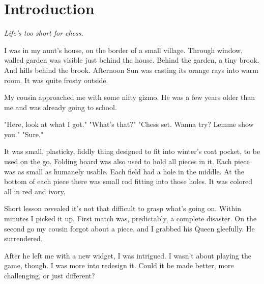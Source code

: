 

\chapter*{Introduction}
\label{ch:Introduction}

\begin{flushright}
\parbox{0.6\textwidth}{
\emph{Life's too short for chess.\newline
{} } }
\end{flushright}

\noindent
I was in my aunt's house, on the border of a small village.
Through window, walled garden was visible just behind the house.
Behind the garden, a tiny brook. And hills behind the brook.
Afternoon Sun was casting its orange rays into warm room. It
was quite frosty outside.

My cousin approached me with some nifty gizmo. He was a
few years older than me and was already going to school.

\noindent
"Here, look at what I got."\newline
\hspace*{\fill}"What's that?"\newline
"Chess set. Wanna try? Lemme show you."\newline
\hspace*{\fill}"Sure."

It was small, plasticky, fiddly thing designed to fit into winter's
coat pocket, to be used on the go. Folding board was also used to
hold all pieces in it. Each piece was as small as humanely usable.
Each field had a hole in the middle. At the bottom of each piece
there was small rod fitting into those holes. It was colored all
in red and ivory.

Short lesson revealed it's not that difficult to grasp what's going
on. Within minutes I picked it up. First match was, predictably, a
complete disaster. On the second go my cousin forgot about a piece,
and I grabbed his Queen gleefully. He surrendered.

After he left me with a new widget, I was intrigued. I wasn't
about playing the game, though. I was more into redesign it. Could it
be made better, more challenging, or just different?

